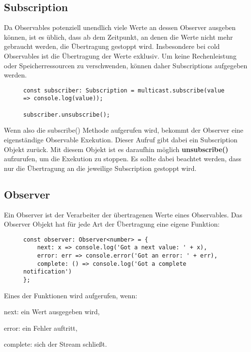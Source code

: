 \subsection{Subscription}

Da Observables potenziell unendlich viele Werte an dessen Observer ausgeben können, ist es üblich, dass ab dem Zeitpunkt, an denen die Werte nicht mehr gebraucht werden, die Übertragung gestoppt wird. Insbesondere bei cold Observables ist die Übertragung der Werte exklusiv. Um keine Rechenleistung oder Speicherressourcen zu verschwenden, können daher Subscriptions aufgegeben werden.

\begin{figure}[H]
\begin{lstlisting}[basicstyle=\small]
const subscriber: Subscription = multicast.subscribe(value => console.log(value));

subscriber.unsubscribe();
\end{lstlisting}
\end{figure}

\noindent
Wenn also die subscribe() Methode aufgerufen wird, bekommt der Observer eine eigenständige Observable Exekution. Dieser Aufruf gibt dabei ein Subscription Objekt zurück. Mit diesem Objekt ist es daraufhin möglich \textbf{unsubscribe()} aufzurufen, um die Exekution zu stoppen. Es sollte dabei beachtet werden, dass nur die Übertragung an die jeweilige Subscription gestoppt wird.

\subsection{Observer}

Ein Observer ist der Verarbeiter der übertragenen Werte eines Observables. Das Observer Objekt hat für jede Art der Übertragung eine eigene Funktion:

\begin{figure}[H]
\begin{lstlisting}[basicstyle=\small]
const observer: Observer<number> = {
    next: x => console.log('Got a next value: ' + x),
    error: err => console.error('Got an error: ' + err),
    complete: () => console.log('Got a complete notification')
};
\end{lstlisting}
\end{figure}

\noindent
Eines der Funktionen wird aufgerufen, wenn:

\begin{description}
\item next: ein Wert ausgegeben wird,
\item error: ein Fehler auftritt,
\item complete: sich der Stream schließt.
\end{description}

